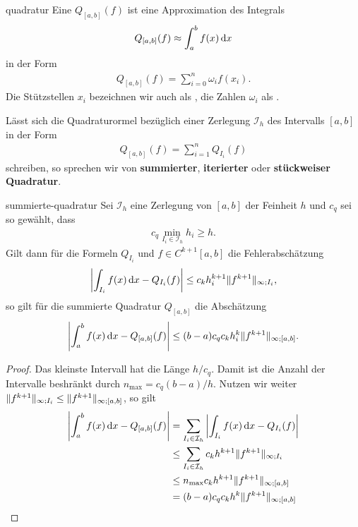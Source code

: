 \begin{Definition}{quadratur}
  Eine  $Q_{[a,b]}(f)$ ist eine Approximation
  des Integrals
  \begin{gather}
    Q_{[a,b]}(f) \approx \int_a^b f(x)\,\mathrm{d} x
  \end{gather}
  in der Form
  \begin{gather}
    Q_{[a,b]}(f) = \sum_{i=0}^n \omega_i f(x_i).
  \end{gather}
  Die Stützstellen $x_i$ bezeichnen wir auch als
  , die Zahlen $\omega_i$ als
  .

  Lässt sich die Quadraturormel bezüglich einer Zerlegung
  $\mathcal I_h$ des Intervalls $[a,b]$ in der Form
  \begin{gather}
    Q_{[a,b]}(f) = \sum_{i=1}^n Q_{I_i} (f)
  \end{gather}
  schreiben, so sprechen wir von \textbf{summierter},
  \textbf{iterierter} oder \textbf{stückweiser Quadratur}.
\end{Definition}

\begin{Satz}{summierte-quadratur}
  Sei $\mathcal I_h$ eine Zerlegung von $[a,b]$ der Feinheit $h$ und
  $c_q$ sei so gewählt, dass
  \begin{gather}
    c_q \min_{I_i\in \mathcal I_h} h_i \ge h.
  \end{gather}
  Gilt dann für die Formeln $Q_{I_i}$ und $f\in C^{k+1}[a,b]$ die
  Fehlerabschätzung
  \begin{gather}
    \left|\int_{I_i} f(x)\,\mathrm{d} x - Q_{I_i}(f)\right|
    \le c_k h_i^{k+1} \lVert f^{k+1}\rVert_{\infty;I_i},
  \end{gather}
  so gilt für die summierte Quadratur $Q_{[a,b]}$ die Abschätzung
  \begin{gather}
    \left|\int_a^b f(x)\,\mathrm{d} x - Q_{[a,b]}(f)\right| \le (b-a) c_q c_k h_i^{k}
    \lVert f^{k+1}\rVert_{\infty;[a,b]}.
  \end{gather}
\end{Satz}

\begin{proof}
  Das kleinste Intervall hat die Länge $h/c_q$. Damit ist die Anzahl
  der Intervalle beshränkt durch $n_{\max}=c_q (b-a)/h$. Nutzen wir weiter
  $\lVert f^{k+1}\rVert_{\infty;I_i} \le \lVert f^{k+1}\rVert_{\infty;[a,b]}$, so gilt
  \begin{align}
    \left|\int_a^b f(x)\,\mathrm{d} x - Q_{[a,b]}(f)\right|
    &= \sum_{I_i\in\mathcal I_h}  \left|\int_{I_i} f(x)\,\mathrm{d} x - Q_{I_i}(f)\right|\\
    &\le \sum_{I_i\in\mathcal I_h} c_k h^{k+1} \lVert f^{k+1}\rVert_{\infty;I_i}\\
    & \le n_{\max} c_k h^{k+1} \lVert f^{k+1}\rVert_{\infty;[a,b]}\\
    & = (b-a) c_q c_k h^{k} \lVert f^{k+1}\rVert_{\infty;[a,b]}
  \end{align}
\end{proof}

